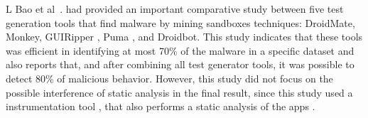 L Bao et al~.\cite{DBLP:conf/wcre/BaoLL18} had provided an important comparative study between five test generation tools that find malware by mining sandboxes techniques: DroidMate, Monkey, GUIRipper \cite{DBLP:conf/kbse/AmalfitanoFTCM12}, Puma \cite{DBLP:conf/mobisys/Hao0NHG14}, and Droidbot. This study indicates that these tools was efficient in identifying at most 70\% of the malware in a specific dataset and also reports that, and after combining all test generator tools, it was possible to detect 80\% of malicious behavior. However, this study did not focus on the possible interference of static analysis in the final result, since this study used a instrumentation tool \cite{DBLP:conf/icsm/CaiR17a}, that also performs a static analysis of the apps .